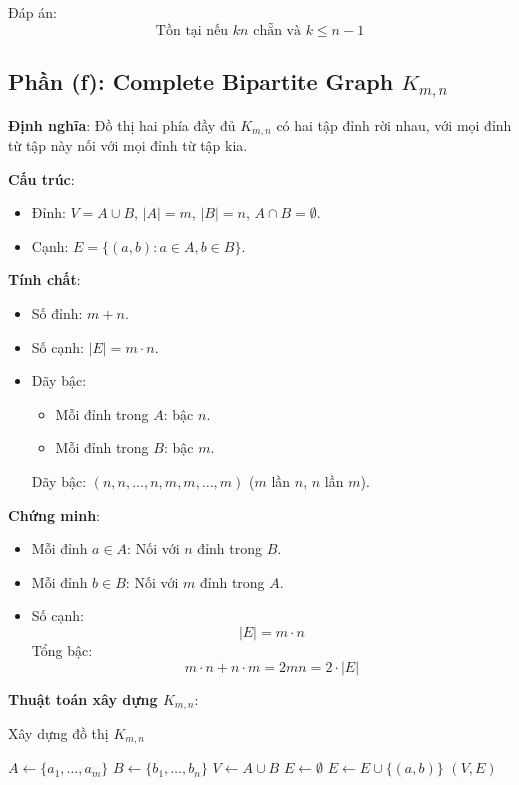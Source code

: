 \documentclass[a4paper,12pt]{article}
\theoremstyle{plain}
\theoremstyle{definition}
\begin{document}
Đáp án:
\[
\boxed{\text{Tồn tại nếu } kn \text{ chẵn và } k \leq n-1}
\]

\subsection*{Phần (f): Complete Bipartite Graph \( K_{m,n} \)}

\textbf{Định nghĩa}: Đồ thị hai phía đầy đủ \( K_{m,n} \) có hai tập đỉnh rời nhau, với mọi đỉnh từ tập này nối với mọi đỉnh từ tập kia.

\textbf{Cấu trúc}:
\begin{itemize}
    \item Đỉnh: \( V = A \cup B \), \( |A| = m \), \( |B| = n \), \( A \cap B = \emptyset \).
    \item Cạnh: \( E = \{(a, b) : a \in A, b \in B\} \).
\end{itemize}

\textbf{Tính chất}:
\begin{itemize}
    \item Số đỉnh: \( m+n \).
    \item Số cạnh: \( |E| = m \cdot n \).
    \item Dãy bậc:
    \begin{itemize}
        \item Mỗi đỉnh trong \( A \): bậc \( n \).
        \item Mỗi đỉnh trong \( B \): bậc \( m \).
    \end{itemize}
    Dãy bậc: \( (n, n, \ldots, n, m, m, \ldots, m) \) (\( m \) lần \( n \), \( n \) lần \( m \)).
\end{itemize}

\textbf{Chứng minh}:
\begin{itemize}
    \item Mỗi đỉnh \( a \in A \): Nối với \( n \) đỉnh trong \( B \).
    \item Mỗi đỉnh \( b \in B \): Nối với \( m \) đỉnh trong \( A \).
    \item Số cạnh:
    \[
    |E| = m \cdot n
    \]
    Tổng bậc:
    \[
    m \cdot n + n \cdot m = 2mn = 2 \cdot |E|
    \]
\end{itemize}

\textbf{Thuật toán xây dựng \( K_{m,n} \)}:
\begin{algorithm}
\caption{Xây dựng đồ thị \( K_{m,n} \)}
\begin{algorithmic}
    \State $A \gets \{a_1, \ldots, a_m\}$
    \State $B \gets \{b_1, \ldots, b_n\}$
    \State $V \gets A \cup B$
    \State $E \gets \emptyset$
            \State $E \gets E \cup \{(a, b)\}$
        \EndFor
    \EndFor
    \State \Return $(V, E)$
\EndFunction
\end{algorithmic}
\end{algorithm}
\end{document}
